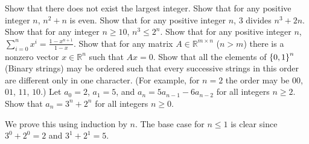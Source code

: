 \begin{chapterendexercises}
    \exercise Show that there does not exist the largest integer.
    \exercise[recommended] Show that for any positive integer $n$, $n^2 + n$ is even.
    \exercise Show that for any positive integer $n$, $3$ divides
        $n^3 + 2n$.
    \exercise Show that for any integer $n \ge 10$,
        $n^3 \le 2^n$.
    \exercise Show that for any positive integer $n$,
        $\sum_{i = 0}^n x^i = \frac{1 - x^{n + 1}}{1 - x}$.
    \exercise[recommended] Show that for any matrix $A \in \mathbb{R}^{m \times n}$
        ($n > m$) there is a nonzero vector $x \in \mathbb{R}^n$ such that $Ax = 0$.
    \exercise[recommended]  Show that all the elements of $\set{0, 1}^n$ (Binary strings)
        may be ordered such that every successive strings in this order are
        different only in one character.
        (For example, for $n = 2$ the order may be $00$, $01$, $11$, $10$.)
    \exercise Let $a_0 = 2$, $a_1 = 5$, and $a_n = 5a_{n - 1} - 6 a_{n - 2}$
        for all integers $n \ge 2$. Show that $a_n = 3^n + 2^n$ for all integers
        $n \ge 0$.
        \begin{solution}
            We prove this using induction by $n$. The base case for $n \le 1$ is clear
            since $3^0 + 2^0 = 2$ and $3^1 + 2^1 = 5$.


\end{solution}
\end{chapterendexercises}
